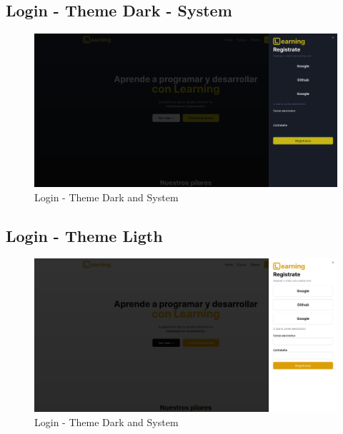 \subsection{Login - Theme Dark - System}
  \begin{figure}[H]
    \centering
    \includegraphics[width=1.0\textwidth]{img/L-DS.png}
    \caption{Login - Theme Dark and System}
  \end{figure}
\subsection{Login - Theme Ligth}
  \begin{figure}[H]
    \centering
    \includegraphics[width=1.0\textwidth]{img/L-L.png}
    \caption{Login - Theme Dark and System}
  \end{figure}









